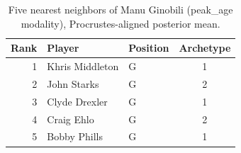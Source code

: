 \begin{table}[htbp]
  \centering\small
  \begin{tabular}{rllc}
    \toprule
    Rank & Player & Position & Archetype \\
    \midrule
    1 & Khris Middleton & G & 1 \\
    2 & John Starks & G & 2 \\
    3 & Clyde Drexler & G & 1 \\
    4 & Craig Ehlo & G & 2 \\
    5 & Bobby Phills & G & 1 \\
    \bottomrule
  \end{tabular}
  \caption{Five nearest neighbors of Manu Ginobili (peak_age modality), Procrustes-aligned posterior mean.}
  \label{tab:Manu_Ginobili_neighbors_peak_age}
\end{table}

